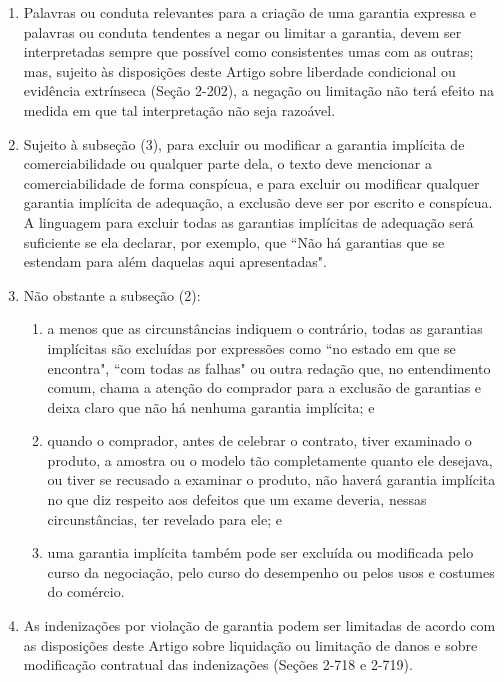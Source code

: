 \documentclass[a4paper, 12pt]{article}
\begin{document}
\begin{enumerate}[label=(\arabic*)]
	\item Palavras ou conduta relevantes para a criação de uma garantia expressa e palavras ou conduta tendentes a negar ou limitar a garantia, devem ser interpretadas sempre que possível como consistentes umas com as outras; mas, sujeito às disposições deste Artigo sobre liberdade condicional ou evidência extrínseca (Seção 2-202), a negação ou limitação não terá efeito na medida em que tal interpretação não seja razoável.
	\item Sujeito à subseção (3), para excluir ou modificar a garantia implícita de comerciabilidade ou qualquer parte dela, o texto deve mencionar a comerciabilidade de forma conspícua, e para excluir ou modificar qualquer garantia implícita de adequação, a exclusão deve ser por escrito e conspícua. A linguagem para excluir todas as garantias implícitas de adequação será suficiente se ela declarar, por exemplo, que ``Não há garantias que se estendam para além daquelas aqui apresentadas".
	\item Não obstante a subseção (2):
	\begin{enumerate}
		\item a menos que as circunstâncias indiquem o contrário, todas as garantias implícitas são excluídas por expressões como ``no estado em que se encontra", ``com todas as falhas" ou outra redação que, no entendimento comum, chama a atenção do comprador para a exclusão de garantias e deixa claro que não há nenhuma garantia implícita; e
		\item quando o comprador, antes de celebrar o contrato, tiver examinado o produto, a amostra ou o modelo tão completamente quanto ele desejava, ou tiver se recusado a examinar o produto, não haverá garantia implícita no que diz respeito aos defeitos que um exame deveria, nessas circunstâncias, ter revelado para ele; e
		\item uma garantia implícita também pode ser excluída ou modificada pelo curso da negociação, pelo curso do desempenho ou pelos usos e costumes do comércio.
	\end{enumerate}
	\item As indenizações por violação de garantia podem ser limitadas de acordo com as disposições deste Artigo sobre liquidação ou limitação de danos e sobre modificação contratual das indenizações (Seções 2-718 e 2-719).
\end{enumerate}
\end{document}
